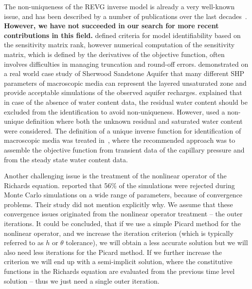 \documentclass[review]{elsarticle}
\begin{document}
The non-uniqueness of the REVG inverse model is already a very well-known issue, and has been described by a number of publications over the last decades~\citep{kool1985, mous1993, ihlwang2003, beven2003-uncertain}. \textbf{However, we have not succeeded in our search for more recent contributions in this field.} \cite{mous1993} defined criteria for model identifiability based on the sensitivity matrix rank, however numerical computation of the sensitivity matrix, which is defined by the derivatives of the objective function, often involves difficulties in managing truncation and round-off errors.
\cite{beven2003-uncertain} demonstrated on a real world case study of Sherwood Sandstone Aquifer that many different SHP parameters of macroscopic media can represent the layered unsaturated zone and provide acceptable simulations of the observed aquifer recharges.  \cite{mous1993} explained that in case of the absence of water content data, the residual water content should be excluded from the identification to avoid non-uniqueness. However, \cite{beven2003-uncertain} used
a non-unique definition where both the unknown residual and saturated water content were considered.
The definition of a unique inverse function for identification of macroscopic media was treated in~\citep{zou200126}, where the recommended approach was to assemble the objective function from transient data of the capillary pressure and from the steady state water content data. %

Another challenging issue is the treatment of the nonlinear operator of the Richards equation. \cite{beven2003-uncertain} reported that 56\% of the simulations were rejected during Monte Carlo simulations on a wide range of parameters, because of convergence problems. 
Their study did not mention explicitly why. We assume that these convergence issues originated from the nonlinear operator treatment -- the outer iterations.
It could be concluded, that if we use a simple Picard method for the nonlinear operator, and we increase the iteration criterion (which is typically referred to as $h$ or $\theta$ tolerance), we will obtain a less accurate solution but we will also need less iterations for the Picard method. If we further increase the criterion we will end up with a semi-implicit solution, where the constitutive functions in the Richards equation are evaluated from the previous time level solution -- thus we just need a single outer iteration.
\end{document}
